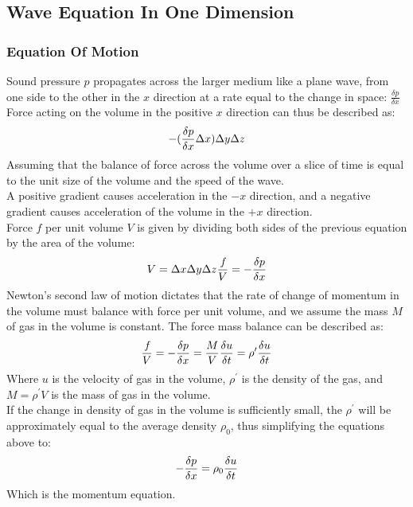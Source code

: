\subsection{Wave Equation In One Dimension}
\subsubsection{Equation Of Motion}

Sound pressure $p$ propagates across the larger medium like a plane wave, from one side to the other in the $x$ direction at a rate equal to the change in space: $\frac{\delta p}{\delta x}$\\
Force acting on the volume in the positive $x$ direction can thus be described as:
\begin{equation}
-(\frac{\delta p}{\delta x} \Delta x) \Delta y \Delta z\\
\end{equation}
Assuming that the balance of force across the volume over a slice of time is equal to the unit size of the volume and the speed of the wave.\\
A positive gradient causes acceleration in the $-x$ direction, and a negative gradient causes acceleration of the volume in the $+x$ direction.\\
Force $\textit{f}$ per unit volume $V$ is given by dividing both sides of the previous equation by the area of the volume:
\begin{equation}
V = \Delta x \Delta y \Delta z\\
\frac{\textit{f}}{V} = -\frac{\delta p}{\delta x}\\
\end{equation}
Newton's second law of motion dictates that the rate of change of momentum in the volume must balance with force per unit volume, and we assume the mass $M$ of gas in the volume is constant. The force mass balance can be described as:
\begin{equation}
 \frac{\textit{f}}{V} = -\frac{\delta p}{\delta x} = \frac{M}{V} \frac{\delta u}{\delta t} = \rho^{\prime}\frac{\delta u}{\delta t}\\ 
\end{equation}
Where $u$ is the velocity of gas in the volume, $\rho^{\prime}$ is the density of the gas, and $M = \rho^{\prime} V$ is the mass of gas in the volume.\\
If the change in density of gas in the volume is sufficiently small, the $\rho^{\prime}$ will be approximately equal to the average density $\rho_0$, thus simplifying the equations above to:
\begin{equation}
 -\frac{\delta p}{\delta x} = \rho_0 \frac{\delta u}{\delta t}\\
\end{equation}
Which is the momentum equation.\\
